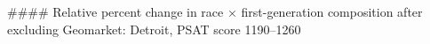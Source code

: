 #### Relative percent change in race × first-generation composition after excluding Geomarket: Detroit, PSAT score 1190–1260
